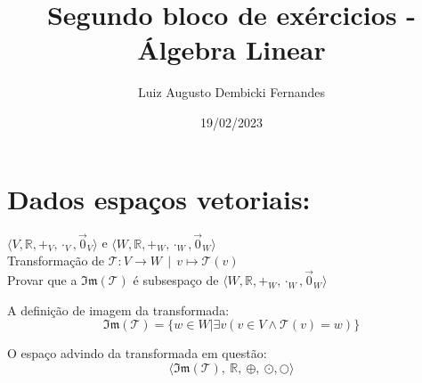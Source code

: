 \documentclass[12pt, twoside, a4]{article} %
\begin{document}
\title{Segundo bloco de exércicios - Álgebra Linear}
\author{Luiz Augusto Dembicki Fernandes}
\date{19/02/2023}
\maketitle

\section{Dados espaços vetoriais:}
\vspace{-0.5cm}
\begin{Large}
        \begin{bf}
        $\langle V, \mathbb{R}, +_V, \cdot_V, \overrightarrow{0}_V  \rangle $ e 
        $\langle W, \mathbb{R}, +_W, \cdot_W, \overrightarrow{0}_W  \rangle $ \\
        Transformação de $ \mathcal{T} : V \to W \ \ | \ \ v \mapsto \mathcal{T}(v) $ \\
        Provar que a $ \mathfrak{Im} (\mathcal{T} ) $ é subsespaço de $\langle W, \mathbb{R}, +_W, \cdot_W, \overrightarrow{0}_W  \rangle $  
    \end{bf}
\end{Large}

A definição de imagem da transformada:
\[ \mathfrak{Im} (\mathcal{T} ) = \{w \in W | \exists v(v \in V \wedge \mathcal{T} (v) = w)\} \]

O espaço advindo da transformada em questão:
\[ \langle \mathfrak{Im} (\mathcal{T}),\ \mathbb{R},\ \oplus ,\ \odot, \bigcirc \rangle \]
\end{document}

